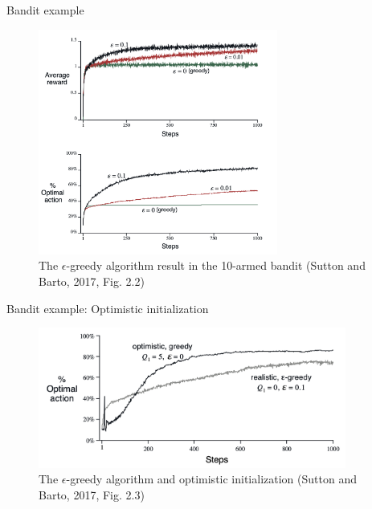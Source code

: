 \documentclass[10pt]{beamer}
\begin{document}
\begin{frame}{Bandit example}

\begin{figure}[h]
\centering
\includegraphics[width=0.7\textwidth]{fig/sutton_fig_2_2.png}
\caption{The $\epsilon$-greedy algorithm result in the 10-armed bandit (Sutton and Barto, 2017, Fig. 2.2)}
\end{figure}

\end{frame}


\begin{frame}{Bandit example: Optimistic initialization}

\begin{figure}[h]
\centering
\includegraphics[width=0.9\textwidth]{fig/sutton_fig_2_3.png}
\caption{The $\epsilon$-greedy algorithm and optimistic initialization (Sutton and Barto, 2017, Fig. 2.3)}
\end{figure}

\end{frame}
\end{document}
